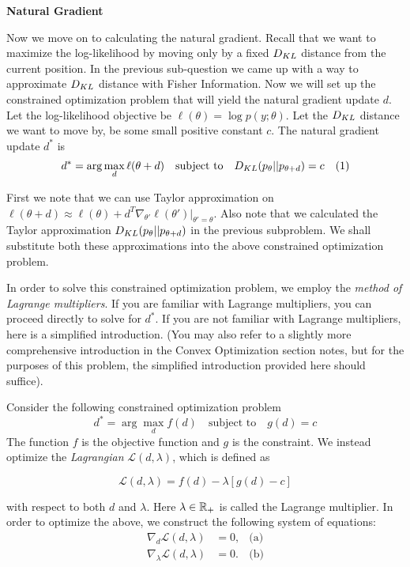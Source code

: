 \item {} \textbf{Natural Gradient}

Now we move on to calculating the natural gradient. Recall that we want to maximize the log-likelihood by moving only by a fixed $D_{KL}$ distance from the current position. In the previous sub-question we came up with a way to approximate $D_{KL}$ distance with Fisher Information. Now we will set up the constrained optimization problem that will yield the natural gradient update $d$. Let the log-likelihood objective be $\ell(\theta) = \log p(y;\theta)$. Let the $D_{KL}$ distance we want to move by, be some small positive constant $c$. The natural gradient update $d^*$ is
\begin{align*}
d^* &= \arg\max_d \ell(\theta + d) \quad \text{subject to} \quad D_{KL}(p_\theta||p_{\theta + d}) = c & \text{(1)}
\end{align*}

First we note that we can use Taylor approximation on $\ell(\theta + d) \approx \ell(\theta) + d^T\nabla_{\theta'}\ell(\theta')|_{\theta'=\theta}$. Also note that we calculated the Taylor approximation $D_{KL}(p_\theta||p_{\theta+d})$ in the previous subproblem. We shall substitute both these approximations into the above constrained optimization problem.

In order to solve this constrained optimization problem, we employ the \emph{method of Lagrange multipliers}. If you are familiar with Lagrange multipliers, you can proceed directly to solve for $d^*$. If you are not familiar with Lagrange multipliers, here is a simplified introduction. (You may also refer to a slightly more comprehensive introduction in the Convex Optimization section notes, but for the purposes of this problem, the simplified introduction provided here should suffice).

Consider the following constrained optimization problem
$$d^\ast =\arg\max_d f(d) \quad \text{subject to} \quad g(d)=c$$
The function $f$ is the objective function and $g$ is the constraint. We instead optimize the \emph{Lagrangian} $\mathcal{L}(d,\lambda)$, which is defined as

$$\mathcal{L}(d,\lambda) = f(d) - \lambda [ g(d)-c ]$$

with respect to both $d$ and $\lambda$. Here $\lambda \in \mathbb{R}_+$ is called the Lagrange multiplier. In order to optimize the above, we construct the following system of equations:
\begin{align*}
 \nabla_d \mathcal{L}(d,\lambda) &= 0, &\text{(a)} \\
 \nabla_\lambda \mathcal{L}(d,\lambda) &= 0. &\text{(b)}
\end{align*}

